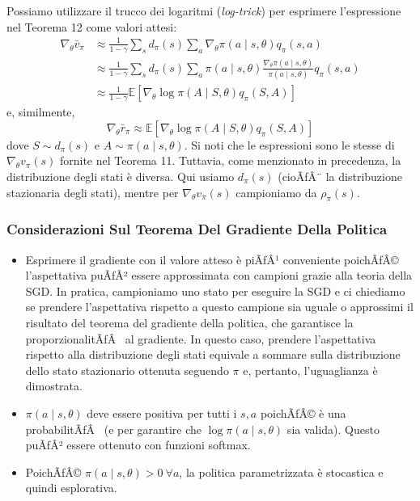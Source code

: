 ﻿\documentclass[11pt, a4paper]{report}
\begin{document}
Possiamo utilizzare il trucco dei logaritmi (\emph{log-trick}) per esprimere l'espressione nel Teorema 12 come valori attesi:
\begin{align*}
\nabla_{\theta} \bar{v}_{\pi} &\approx \frac{1}{1 - \gamma} \sum_s d_{\pi}(s) \sum_a \nabla_{\theta} \pi(a \mid s, \theta) q_{\pi}(s, a) \\
&\approx \frac{1}{1 - \gamma} \sum_s d_{\pi}(s) \sum_a \pi(a \mid s, \theta) \frac{\nabla_{\theta} \pi(a \mid s, \theta)}{\pi(a \mid s, \theta)} q_{\pi}(s, a) \\
&\approx \frac{1}{1 - \gamma} \mathbb{E} [\nabla_{\theta} \log \pi(A \mid S, \theta) q_{\pi}(S, A)]
\end{align*}
e, similmente,
\begin{equation}
\nabla_{\theta} \bar{r}_{\pi} \approx \mathbb{E} [\nabla_{\theta} \log \pi(A \mid S, \theta) q_{\pi}(S, A)]
\end{equation}
dove $S \sim d_{\pi}(s)$ e $A \sim \pi(a \mid s, \theta)$. Si noti che le espressioni sono le stesse di $\nabla_{\theta} v_{\pi}(s)$ fornite nel Teorema 11. Tuttavia, come menzionato in precedenza, la distribuzione degli stati è diversa. Qui usiamo $d_{\pi}(s)$ (cioÃƒÂ¨ la distribuzione stazionaria degli stati), mentre per $\nabla_{\theta} v_{\pi}(s)$ campioniamo da $\rho_{\pi}(s)$.

\subsubsection{Considerazioni Sul Teorema Del Gradiente Della Politica}
\begin{itemize}
    \item Esprimere il gradiente con il valore atteso è piÃƒÂ¹ conveniente poichÃƒÂ© l'aspettativa puÃƒÂ² essere approssimata con campioni grazie alla teoria della SGD. In pratica, campioniamo uno stato per eseguire la SGD e ci chiediamo se prendere l'aspettativa rispetto a questo campione sia uguale o approssimi il risultato del teorema del gradiente della politica, che garantisce la proporzionalitÃƒÂ  al gradiente. In questo caso, prendere l'aspettativa rispetto alla distribuzione degli stati equivale a sommare sulla distribuzione dello stato stazionario ottenuta seguendo $\pi$ e, pertanto, l'uguaglianza è dimostrata.
    \item $\pi(a \mid s, \theta)$ deve essere positiva per tutti i $s, a$ poichÃƒÂ© è una probabilitÃƒÂ  (e per garantire che $\log \pi(a \mid s, \theta)$ sia valida). Questo puÃƒÂ² essere ottenuto con funzioni softmax.
    \item PoichÃƒÂ© $\pi(a \mid s, \theta) > 0 \ \forall a$, la politica parametrizzata è stocastica e quindi esplorativa.
\end{itemize}
\end{document}
